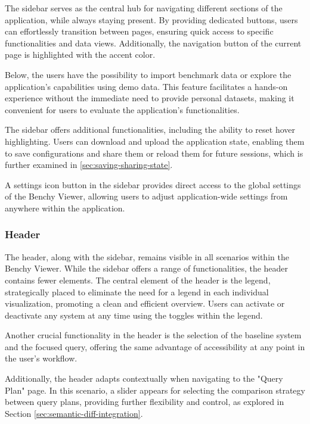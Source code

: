 The sidebar serves as the central hub for navigating different sections of the application, while always staying present. By providing dedicated buttons, users can effortlessly transition between pages, ensuring quick access to specific functionalities and data views. Additionally, the navigation button of the current page is highlighted with the accent color.

Below, the users have the possibility to import benchmark data or explore the application's capabilities using demo data. This feature facilitates a hands-on experience without the immediate need to provide personal datasets, making it convenient for users to evaluate the application's functionalities.

The sidebar offers additional functionalities, including the ability to reset hover highlighting. Users can download and upload the application state, enabling them to save configurations and share them or reload them for future sessions, which is further examined in \ref{sec:saving-sharing-state}. 

A settings icon button in the sidebar provides direct access to the global settings of the Benchy Viewer, allowing users to adjust application-wide settings from anywhere within the application.



\subsubsection{Header}
The header, along with the sidebar, remains visible in all scenarios within the Benchy Viewer. While the sidebar offers a range of functionalities, the header contains fewer elements. The central element of the header is the legend, strategically placed to eliminate the need for a legend in each individual visualization, promoting a clean and efficient overview. Users can activate or deactivate any system at any time using the toggles within the legend.

Another crucial functionality in the header is the selection of the baseline system and the focused query, offering the same advantage of accessibility at any point in the user's workflow.

Additionally, the header adapts contextually when navigating to the "Query Plan" page. In this scenario, a slider appears for selecting the comparison strategy between query plans, providing further flexibility and control, as explored in Section \ref{sec:semantic-diff-integration}.



